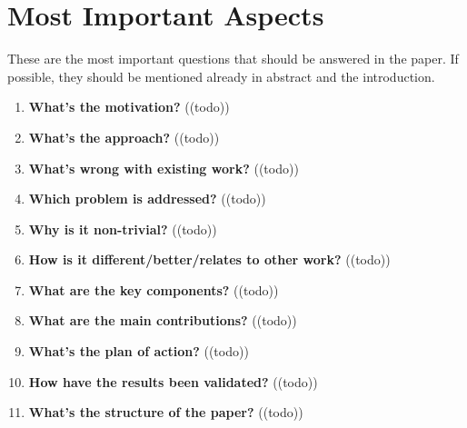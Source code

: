 \section{Most Important Aspects}\label{sec:mia}
These are the most important questions that should be answered in the paper. If possible,
they should be mentioned already in abstract and the introduction.
\begin{enumerate}[resume]
    \item \textbf{What’s the motivation?} 	\textcolor{HighlightColor}{((todo))}
    \item \textbf{What’s the approach?} 	\textcolor{HighlightColor}{((todo))}
    \item \textbf{What’s wrong with existing work?} 	\textcolor{HighlightColor}{((todo))}
    \item \textbf{Which problem is addressed?} 	\textcolor{HighlightColor}{((todo))}
    \item \textbf{Why is it non-trivial?
} 	\textcolor{HighlightColor}{((todo))}
    \item \textbf{How is it different/better/relates to other work?
} 	\textcolor{HighlightColor}{((todo))}
    \item \textbf{What are the key components?} 	\textcolor{HighlightColor}{((todo))}
    \item \textbf{What are the main contributions?} 	\textcolor{HighlightColor}{((todo))}
    \item \textbf{What’s the plan of action?} 	\textcolor{HighlightColor}{((todo))}
    \item \textbf{How have the results been validated?
} 	\textcolor{HighlightColor}{((todo))}
    \item \textbf{What’s the structure of the paper?} 	\textcolor{HighlightColor}{((todo))}
\end{enumerate}

